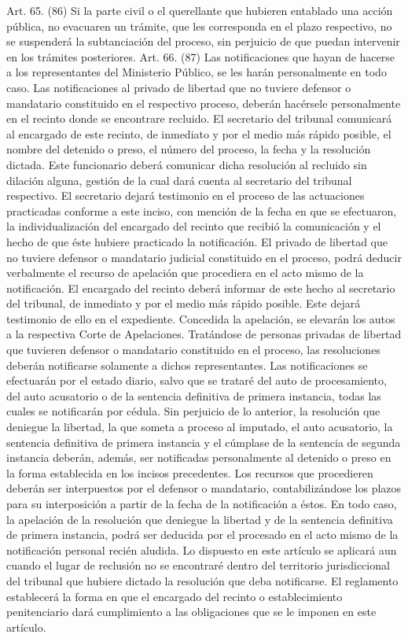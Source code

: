     Art. 65. (86) Si la parte civil o el querellante que hubieren entablado una acción pública, no evacuaren un trámite, que les corresponda en el plazo respectivo, no se suspenderá la subtanciación del proceso, sin perjuicio de que puedan intervenir en los trámites posteriores.
    Art. 66. (87) Las notificaciones que hayan de hacerse a los representantes del Ministerio Público, se les harán personalmente en todo caso.
    Las notificaciones al privado de libertad que no tuviere defensor o mandatario constituido en el respectivo proceso, deberán hacérsele personalmente en el recinto donde se encontrare recluido. El secretario del tribunal comunicará al encargado de este recinto, de inmediato y por el medio más rápido posible, el nombre del detenido o preso, el número del proceso, la fecha y la resolución dictada. Este funcionario deberá comunicar dicha resolución al recluido sin dilación alguna, gestión de la cual dará cuenta al secretario del tribunal respectivo. El secretario dejará testimonio en el proceso de las actuaciones practicadas conforme a este inciso, con mención de la fecha en que se efectuaron, la individualización del encargado del recinto que recibió la comunicación y el hecho de que éste hubiere practicado la notificación.
    El privado de libertad que no tuviere defensor o mandatario judicial constituido en el proceso, podrá deducir verbalmente el recurso de apelación que procediera en el acto mismo de la notificación. El encargado del recinto deberá informar de este hecho al secretario del tribunal, de inmediato y por el medio más rápido posible. Este dejará testimonio de ello en el expediente. Concedida la apelación, se elevarán los autos a la respectiva Corte de Apelaciones.
    Tratándose de personas privadas de libertad que tuvieren defensor o mandatario constituido en el proceso, las resoluciones deberán notificarse solamente a dichos representantes. Las notificaciones se efectuarán por el estado diario, salvo que se trataré del auto de procesamiento, del auto acusatorio o de la sentencia definitiva de primera instancia, todas las cuales se notificarán por cédula. Sin perjuicio de lo anterior, la resolución que deniegue la libertad, la que someta a proceso al imputado, el auto acusatorio, la sentencia definitiva de primera instancia y el cúmplase de la sentencia de segunda instancia deberán, además, ser notificadas personalmente al detenido o preso en la forma establecida en los incisos precedentes. Los recursos que procedieren deberán ser interpuestos por el defensor o mandatario, contabilizándose los plazos para su interposición a partir de la fecha de la notificación a éstos. En todo caso, la apelación de la resolución que deniegue la libertad y de la sentencia definitiva de primera instancia, podrá ser deducida por el procesado en el acto mismo de la notificación personal recién aludida.
    Lo dispuesto en este artículo se aplicará aun cuando el lugar de reclusión no se encontraré dentro del territorio jurisdiccional del tribunal que hubiere dictado la resolución que deba notificarse.
    El reglamento establecerá la forma en que el encargado del recinto o establecimiento penitenciario dará cumplimiento a las obligaciones que se le imponen en este artículo.

